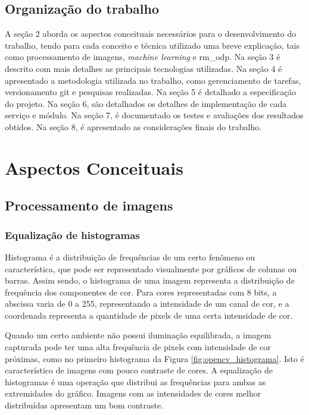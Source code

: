 \documentclass[]{politex}
\begin{document}
\section{Organização do trabalho}
A seção 2 aborda os aspectos conceituais necessários para o desenvolvimento do trabalho, tendo para cada conceito e técnica utilizado uma breve explicação, tais como processamento de imagens, \textit{machine learning} e \acrshort{rm_odp}. Na seção 3 é descrito com mais detalhes as principais tecnologias utilizadas. Na seção 4 é apresentado a metodologia utilizada no trabalho, como gerenciamento de tarefas, versionamento git e pesquisas realizadas. Na seção 5 é detalhado a especificação do projeto. Na seção 6, são detalhados os detalhes de implementação de cada serviço e módulo. Na seção 7, é documentado os testes e avaliações dos resultados obtidos. Na seção 8, é apresentado as considerações finais do trabalho.

\chapter{Aspectos Conceituais}

\section{Processamento de imagens}
\subsection{Equalização de histogramas} \label{histogramas}
Histograma é a distribuição de frequências de um certo fenômeno ou característica, que pode ser representado visualmente por gráficos de colunas ou barras. Assim sendo, o histograma de uma imagem representa a distribuição de frequência dos componentes de cor. Para cores representadas com 8 bits, a abscissa varia de 0 a 255, representando a intensidade de um canal de cor, e a coordenada representa a quantidade de pixels de uma certa intensidade de cor.

Quando um certo ambiente não possui iluminação equilibrada, a imagem capturada pode ter uma alta frequência de pixels com intensidade de cor próximas, como no primeiro histograma da Figura \ref{fig:opencv_histograma}. Isto é característico de imagens com pouco contraste de cores. A equalização de histogramas é uma operação que distribui as frequências para ambas as extremidades do gráfico. Imagens com as intensidades de cores melhor distribuídas apresentam um bom contraste.
\end{document}
